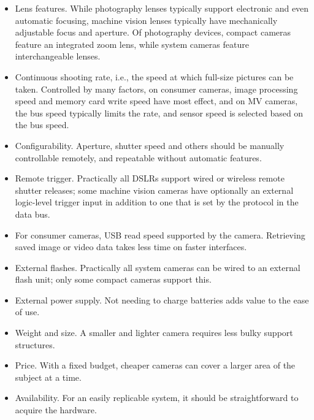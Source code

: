 \begin{itemize}
	\item Lens features.
		While photography lenses typically support electronic and even automatic focusing, machine vision lenses typically have mechanically adjustable focus and aperture.
		Of photography devices, compact cameras feature an integrated zoom lens, while system cameras feature interchangeable lenses.

	\item Continuous shooting rate, i.e., the speed at which full-size pictures can be taken.
		Controlled by many factors, on consumer cameras, image processing speed and memory card write speed have most effect, and on MV cameras, the bus speed typically limits the rate, and sensor speed is selected based on the bus speed.

	\item Configurability.
		Aperture, shutter speed and others should be manually controllable remotely, and repeatable without automatic features.

	\item Remote trigger.
		Practically all DSLRs support wired or wireless remote shutter releases; some machine vision cameras have optionally an external logic-level trigger input in addition to one that is set by the protocol in the data bus. %

	\item For consumer cameras, USB read speed supported by the camera.
		Retrieving saved image or video data takes less time on faster interfaces.

	\item External flashes.
		Practically all system cameras can be wired to an external flash unit; only some compact cameras support this.

	\item External power supply.
		Not needing to charge batteries adds value to the ease of use.

	\item Weight and size.
		A smaller and lighter camera requires less bulky support structures.

	\item Price.
		With a fixed budget, cheaper cameras can cover a larger area of the subject at a time.

	\item Availability.
		For an easily replicable system, it should be straightforward to acquire the hardware.
\end{itemize}

